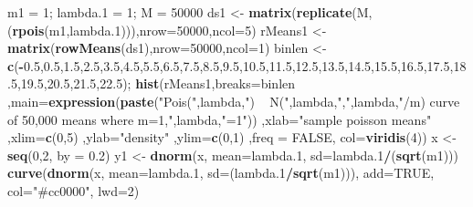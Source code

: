 \documentclass[
]{article}
\newenvironment{Shaded}{\begin{snugshade}}{\end{snugshade}}
\newcommand{\DataTypeTok}[1]{\textcolor[rgb]{0.13,0.29,0.53}{#1}}
\newcommand{\DecValTok}[1]{\textcolor[rgb]{0.00,0.00,0.81}{#1}}
\newcommand{\FloatTok}[1]{\textcolor[rgb]{0.00,0.00,0.81}{#1}}
\newcommand{\KeywordTok}[1]{\textcolor[rgb]{0.13,0.29,0.53}{\textbf{#1}}}
\newcommand{\NormalTok}[1]{#1}
\newcommand{\OperatorTok}[1]{\textcolor[rgb]{0.81,0.36,0.00}{\textbf{#1}}}
\newcommand{\OtherTok}[1]{\textcolor[rgb]{0.56,0.35,0.01}{#1}}
\newcommand{\StringTok}[1]{\textcolor[rgb]{0.31,0.60,0.02}{#1}}
\begin{document}
\begin{Shaded}
\begin{Highlighting}[]
\NormalTok{m1 =}\StringTok{ }\DecValTok{1}\NormalTok{; lambda}\FloatTok{.1}\NormalTok{ =}\StringTok{ }\DecValTok{1}\NormalTok{; M =}\StringTok{ }\DecValTok{50000}
\NormalTok{ds1 <-}\StringTok{ }\KeywordTok{matrix}\NormalTok{(}\KeywordTok{replicate}\NormalTok{(M,(}\KeywordTok{rpois}\NormalTok{(m1,lambda}\FloatTok{.1}\NormalTok{))),}\DataTypeTok{nrow=}\DecValTok{50000}\NormalTok{,}\DataTypeTok{ncol=}\DecValTok{5}\NormalTok{)}
\NormalTok{rMeans1 <-}\StringTok{ }\KeywordTok{matrix}\NormalTok{(}\KeywordTok{rowMeans}\NormalTok{(ds1),}\DataTypeTok{nrow=}\DecValTok{50000}\NormalTok{,}\DataTypeTok{ncol=}\DecValTok{1}\NormalTok{)}
\NormalTok{binlen <-}\StringTok{ }\KeywordTok{c}\NormalTok{(}\OperatorTok{-}\FloatTok{0.5}\NormalTok{,}\FloatTok{0.5}\NormalTok{,}\FloatTok{1.5}\NormalTok{,}\FloatTok{2.5}\NormalTok{,}\FloatTok{3.5}\NormalTok{,}\FloatTok{4.5}\NormalTok{,}\FloatTok{5.5}\NormalTok{,}\FloatTok{6.5}\NormalTok{,}\FloatTok{7.5}\NormalTok{,}\FloatTok{8.5}\NormalTok{,}\FloatTok{9.5}\NormalTok{,}\FloatTok{10.5}\NormalTok{,}\FloatTok{11.5}\NormalTok{,}\FloatTok{12.5}\NormalTok{,}\FloatTok{13.5}\NormalTok{,}\FloatTok{14.5}\NormalTok{,}\FloatTok{15.5}\NormalTok{,}\FloatTok{16.5}\NormalTok{,}\FloatTok{17.5}\NormalTok{,}\FloatTok{18.5}\NormalTok{,}\FloatTok{19.5}\NormalTok{,}\FloatTok{20.5}\NormalTok{,}\FloatTok{21.5}\NormalTok{,}\FloatTok{22.5}\NormalTok{);}
\KeywordTok{hist}\NormalTok{(rMeans1,}\DataTypeTok{breaks=}\NormalTok{binlen ,}\DataTypeTok{main=}\KeywordTok{expression}\NormalTok{(}\KeywordTok{paste}\NormalTok{(}\StringTok{"Pois("}\NormalTok{,lambda,}\StringTok{") ~ N("}\NormalTok{,lambda,}\StringTok{","}\NormalTok{,lambda,}\StringTok{"/m) curve of 50,000 means where m=1,"}\NormalTok{,lambda,}\StringTok{"=1"}\NormalTok{))  ,}\DataTypeTok{xlab=}\StringTok{"sample poisson means"}\NormalTok{ ,}\DataTypeTok{xlim=}\KeywordTok{c}\NormalTok{(}\DecValTok{0}\NormalTok{,}\DecValTok{5}\NormalTok{) ,}\DataTypeTok{ylab=}\StringTok{"density"}\NormalTok{ ,}\DataTypeTok{ylim=}\KeywordTok{c}\NormalTok{(}\DecValTok{0}\NormalTok{,}\DecValTok{1}\NormalTok{) ,}\DataTypeTok{freq =} \OtherTok{FALSE}\NormalTok{, }\DataTypeTok{col=}\KeywordTok{viridis}\NormalTok{(}\DecValTok{4}\NormalTok{))}
\NormalTok{x <-}\StringTok{ }\KeywordTok{seq}\NormalTok{(}\DecValTok{0}\NormalTok{,}\DecValTok{2}\NormalTok{, }\DataTypeTok{by =} \FloatTok{0.2}\NormalTok{)}
\NormalTok{y1 <-}\StringTok{ }\KeywordTok{dnorm}\NormalTok{(x, }\DataTypeTok{mean=}\NormalTok{lambda}\FloatTok{.1}\NormalTok{, }\DataTypeTok{sd=}\NormalTok{lambda}\FloatTok{.1}\OperatorTok{/}\NormalTok{(}\KeywordTok{sqrt}\NormalTok{(m1)))}
\KeywordTok{curve}\NormalTok{(}\KeywordTok{dnorm}\NormalTok{(x, }\DataTypeTok{mean=}\NormalTok{lambda}\FloatTok{.1}\NormalTok{, }\DataTypeTok{sd=}\NormalTok{(lambda}\FloatTok{.1}\OperatorTok{/}\KeywordTok{sqrt}\NormalTok{(m1))), }\DataTypeTok{add=}\OtherTok{TRUE}\NormalTok{, }\DataTypeTok{col=}\StringTok{"#cc0000"}\NormalTok{, }\DataTypeTok{lwd=}\DecValTok{2}\NormalTok{)}
\end{Highlighting}
\end{Shaded}
\end{document}
